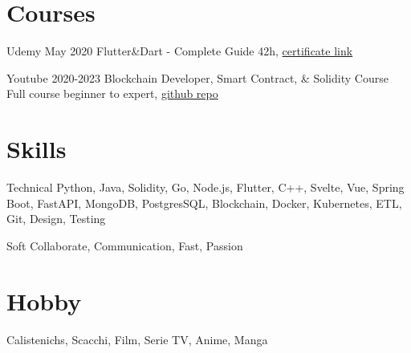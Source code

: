 \documentclass{tccv}
\begin{document}
\section{Courses}

\begin{yearlist}

\item[Udemy]{May 2020}
     {Flutter\&Dart - Complete Guide}
     {42h, \href{https://www.udemy.com/certificate/UC-c6f5a32f-babc-42f9-8a0a-6effadf9e7cd/}{certificate link}}

\item[Youtube]{2020-2023}
    {Blockchain Developer, Smart Contract, \& Solidity Course}
    {Full course beginner to expert, \href{https://github.com/Cyfrin/foundry-full-course-f23}{github repo}}

\end{yearlist}


\section{Skills}

\begin{factlist}

\item{Technical}
     {Python, Java, Solidity, Go, Node.js, Flutter, C++, Svelte, Vue, Spring Boot, FastAPI, MongoDB, PostgresSQL, Blockchain, Docker, Kubernetes, ETL, Git, Design, Testing}

\item{Soft}
     {Collaborate, Communication, Fast, Passion}

\end{factlist}


\section{Hobby}

Calistenichs, Scacchi, Film, Serie TV, Anime, Manga
\end{document}
